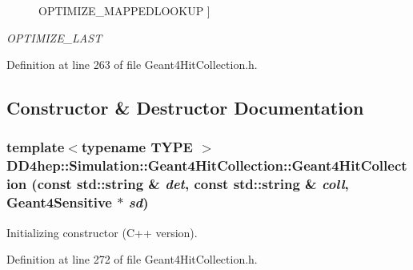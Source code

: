 \begin{Desc}
\begin{description}
{{OPTIMIZE\_\-MAPPEDLOOKUP}
\label{class_d_d4hep_1_1_simulation_1_1_geant4_hit_collection_a8fe757ca872800562e5317df0597c844a762d4b5ef6144a6b8d6b9f5ae9f70450}
}]\item[{\em 
\hypertarget{class_d_d4hep_1_1_simulation_1_1_geant4_hit_collection_a8fe757ca872800562e5317df0597c844ac14cd6ddf70dd174f944eca4790515b8}{
OPTIMIZE\_\-LAST}
\label{class_d_d4hep_1_1_simulation_1_1_geant4_hit_collection_a8fe757ca872800562e5317df0597c844ac14cd6ddf70dd174f944eca4790515b8}
}]\end{description}
\end{Desc}



Definition at line 263 of file Geant4HitCollection.h.

\subsection{Constructor \& Destructor Documentation}
\hypertarget{class_d_d4hep_1_1_simulation_1_1_geant4_hit_collection_a44b9a5315be35dd719cac956ff6f7417}{
\subsubsection[{Geant4HitCollection}]{\setlength{\rightskip}{0pt plus 5cm}template$<$typename TYPE $>$ DD4hep::Simulation::Geant4HitCollection::Geant4HitCollection (const std::string \& {\em det}, \/  const std::string \& {\em coll}, \/  {\bf Geant4Sensitive} $\ast$ {\em sd})}}
\label{class_d_d4hep_1_1_simulation_1_1_geant4_hit_collection_a44b9a5315be35dd719cac956ff6f7417}


Initializing constructor (C++ version). 

Definition at line 272 of file Geant4HitCollection.h.

